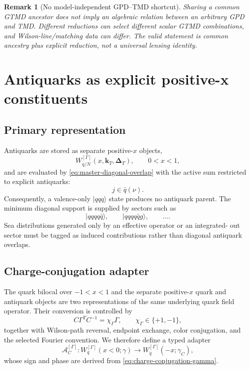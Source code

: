 \documentclass[11pt]{article}
\newtheorem{remark}[definition]{Remark}
\newcommand{\kT}{\bm{k}_{T}}
\newcommand{\DT}{\bm{\Delta}_{T}}
\newcommand{\cA}{\mathcal A}
\begin{document}
\begin{remark}[No model-independent GPD--TMD shortcut]
Sharing a common GTMD ancestor does not imply an algebraic relation between an
arbitrary GPD and TMD.  Different reductions can select different scalar
GTMD combinations, and Wilson-line/matching data can differ.  The valid
statement is common ancestry plus explicit reduction, not a universal
lensing identity.
\end{remark}

\section{Antiquarks as explicit positive-x constituents}
\label{sec:antiquark}

\subsection{Primary representation}

Antiquarks are stored as separate positive-\(x\) objects,
\begin{equation}
 W_{\bar q/N}^{[\Gamma]}(x,\kT,\DT),
 \qquad 0<x<1,
\label{eq:positive-x-antiquark}
\end{equation}
and are evaluated by \cref{eq:master-diagonal-overlap} with the active sum
restricted to explicit antiquarks:
\begin{equation}
 j\in\bar q(\nu).
\label{eq:active-antiquark-set}
\end{equation}
Consequently, a valence-only \(|qqq\rangle\) state produces no antiquark
parent.  The minimum diagonal support is supplied by sectors such as
\begin{equation}
 |qqqq\bar q\rangle,
 \qquad
 |qqqq\bar q g\rangle,
 \qquad\ldots.
\label{eq:antiquark-sectors}
\end{equation}
Sea distributions generated only by an effective operator or an integrated-
out sector must be tagged as induced contributions rather than diagonal
antiquark overlaps.

\subsection{Charge-conjugation adapter}

The quark bilocal over \(-1<x<1\) and the separate positive-\(x\) quark and
antiquark objects are two representations of the same underlying quark field
operator.  Their conversion is controlled by
\begin{equation}
 C\Gamma^T C^{-1}=\chi_\Gamma\Gamma,
 \qquad
 \chi_\Gamma\in\{+1,-1\},
\label{eq:charge-conjugation-gamma}
\end{equation}
together with Wilson-path reversal, endpoint exchange, color conjugation,
and the selected Fourier convention.  We therefore define a typed adapter
\begin{equation}
 \cA_C^{[\Gamma]}:
 W_q^{[\Gamma]}(x<0;\gamma)
 \longrightarrow
 W_{\bar q}^{[\Gamma]}(-x;\gamma_C),
\label{eq:charge-conjugation-adapter}
\end{equation}
whose sign and phase are derived from \cref{eq:charge-conjugation-gamma}.
\end{document}
